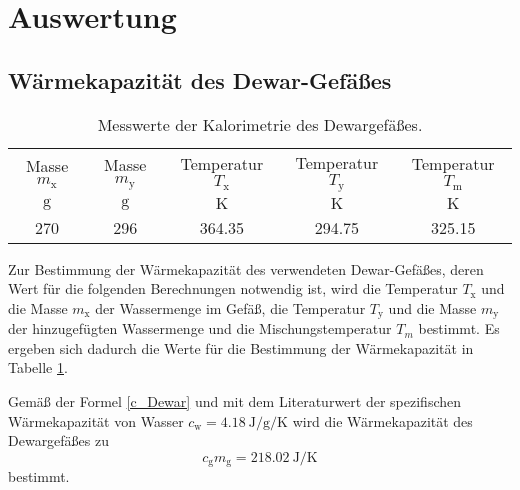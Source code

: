 \section{Auswertung}
\label{sec:Auswertung}
\subsection{Wärmekapazität des Dewar-Gefäßes}
\begin{table}[ht]
	\centering
	\begin{tabular}{ccccc}%
		\toprule
		{Masse $m_\text{x}$}& {Masse $m_\text{y}$}  &{Temperatur  $T_\text{x}$}&{Temperatur $T_\text{y}$}  &{Temperatur $T_\text{m}$}\\
		{$\si{\gram}$}& {$\si{\gram}$}  &{$\si{\kelvin}$}& {$\si{\kelvin}$}  &{$\si{\kelvin}$}\\
		\midrule
		270 & 296 & 364.35 & 294.75 & 325.15\\
		\bottomrule
	\end{tabular}
	\caption{Messwerte der Kalorimetrie des Dewargefäßes.}
	\label{tab:messung1}
\end{table}
Zur Bestimmung der Wärmekapazität des verwendeten Dewar-Gefäßes, deren Wert für die folgenden Berechnungen notwendig ist,
wird die Temperatur $T_\text{x}$ und die Masse $m_\text{x}$ der Wassermenge im Gefäß, die Temperatur $T_\text{y}$ und die Masse $m_\text{y}$ der hinzugefügten Wassermenge und die Mischungstemperatur $T_m$ bestimmt.
Es ergeben sich dadurch die Werte für die Bestimmung der Wärmekapazität in Tabelle \ref{tab:messung1}.

Gemäß der Formel \eqref{c_Dewar}
und mit dem Literaturwert\cite{NO} der spezifischen Wärmekapazität von Wasser
$c_\text{w}=\SI{4.18}{\joule\per\gram\per\kelvin}$\cite{V201} wird die Wärmekapazität des Dewargefäßes zu
\begin{equation}
	c_\mathup{g}m_\mathup{g}=\SI{218.02}{\joule\per\kelvin}
	\label{wert:waerme_dewar}
\end{equation}
bestimmt.

